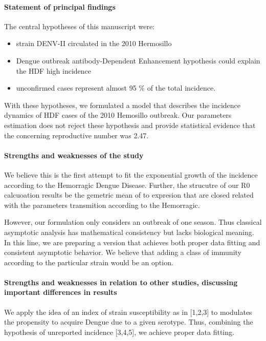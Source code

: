     \paragraph{Statement of principal findings}
        The central hypotheses of this manuscript were:
        \begin{itemize}
            \item
                strain DENV-II circulated in the 2010 Hermosillo 
            \item
                Dengue outbreak antibody-Dependent Enhancement hypothesis
                could explain the HDF high incidence 
            \item
                unconfirmed cases represent almost 95 \% of the total
                incidence.
        \end{itemize}
    With these hypotheses, we formulated a model that describes
    the incidence dynamics of HDF cases of the 2010 Hemosillo outbreak.
    Our parameters estimation does not reject these hypothesis and provide
    statistical evidence that the concerning reproductive number was 2.47.
    

    \paragraph{Strengths and weaknesses of the study}
        We believe this is the first attempt to fit the exponential 
    growth of the incidence according to the Hemorragic Dengue Disease. 
    Further, the strucutre of our R0 calcuoation results be 
    the gemetric mean of to expresion that are closed related 
    with the parameters transmition according to the Hemorragic.  

    
        However, our formulation only considers an outbreak of one season.
    Thus classical asymptotic analysis has mathematical consistency
    but lacks biological meaning.  In this line, we are preparing a
    version that achieves both \textemdash proper data fitting and consistent
    asymptotic behavior. We believe that adding a class of immunity
    according to the particular strain would be an option.

    \paragraph{Strengths and weaknesses in relation 
        to other studies, discussing important
        differences in results}
        
        We apply the idea of an index of strain susceptibility as in [1,2,3] 
    to modulates the propensity to acquire Dengue due to a given serotype.  Thus,
    combining the hypothesis of unreported incidence [3,4,5], we achieve
    proper data fitting.

